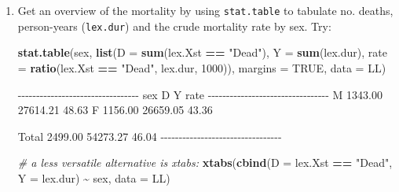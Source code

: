 \documentclass[
]{book}
\newenvironment{Shaded}{\begin{snugshade}}{\end{snugshade}}
\newcommand{\AttributeTok}[1]{\textcolor[rgb]{0.13,0.29,0.53}{#1}}
\newcommand{\CommentTok}[1]{\textcolor[rgb]{0.56,0.35,0.01}{\textit{#1}}}
\newcommand{\ConstantTok}[1]{\textcolor[rgb]{0.56,0.35,0.01}{#1}}
\newcommand{\DecValTok}[1]{\textcolor[rgb]{0.00,0.00,0.81}{#1}}
\newcommand{\FunctionTok}[1]{\textcolor[rgb]{0.13,0.29,0.53}{\textbf{#1}}}
\newcommand{\NormalTok}[1]{#1}
\newcommand{\SpecialCharTok}[1]{\textcolor[rgb]{0.81,0.36,0.00}{\textbf{#1}}}
\newcommand{\StringTok}[1]{\textcolor[rgb]{0.31,0.60,0.02}{#1}}
\begin{document}
\begin{enumerate}
  Take a look at the first few lines of the resulting dataset, for
  example using \texttt{head()}.
\item
  Get an overview of the mortality by using \texttt{stat.table}
  to tabulate no. deaths, person-years (\texttt{lex.dur}) and the
  crude mortality rate by sex. Try:

\begin{Shaded}
\begin{Highlighting}[]
\FunctionTok{stat.table}\NormalTok{(sex,}
           \FunctionTok{list}\NormalTok{(}\AttributeTok{D =} \FunctionTok{sum}\NormalTok{(lex.Xst }\SpecialCharTok{==} \StringTok{"Dead"}\NormalTok{),}
                \AttributeTok{Y =} \FunctionTok{sum}\NormalTok{(lex.dur),}
             \AttributeTok{rate =} \FunctionTok{ratio}\NormalTok{(lex.Xst }\SpecialCharTok{==} \StringTok{"Dead"}\NormalTok{,}
\NormalTok{                          lex.dur,}
                          \DecValTok{1000}\NormalTok{)),}
          \AttributeTok{margins =} \ConstantTok{TRUE}\NormalTok{,}
             \AttributeTok{data =}\NormalTok{ LL)}
\end{Highlighting}
\end{Shaded}

\begin{Shaded}
\begin{Highlighting}[]
\NormalTok{ {-}{-}{-}{-}{-}{-}{-}{-}{-}{-}{-}{-}{-}{-}{-}{-}{-}{-}{-}{-}{-}{-}{-}{-}{-}{-}{-}{-}{-}{-}{-}{-}{-} }
\NormalTok{ sex           D        Y    rate  }
\NormalTok{ {-}{-}{-}{-}{-}{-}{-}{-}{-}{-}{-}{-}{-}{-}{-}{-}{-}{-}{-}{-}{-}{-}{-}{-}{-}{-}{-}{-}{-}{-}{-}{-}{-} }
\NormalTok{ M       1343.00 27614.21   48.63  }
\NormalTok{ F       1156.00 26659.05   43.36  }

\NormalTok{ Total   2499.00 54273.27   46.04  }
\NormalTok{ {-}{-}{-}{-}{-}{-}{-}{-}{-}{-}{-}{-}{-}{-}{-}{-}{-}{-}{-}{-}{-}{-}{-}{-}{-}{-}{-}{-}{-}{-}{-}{-}{-} }
\end{Highlighting}
\end{Shaded}

\begin{Shaded}
\begin{Highlighting}[]
\CommentTok{\# a less versatile alternative is xtabs:}
\FunctionTok{xtabs}\NormalTok{(}\FunctionTok{cbind}\NormalTok{(}\AttributeTok{D =}\NormalTok{ lex.Xst }\SpecialCharTok{==} \StringTok{"Dead"}\NormalTok{,}
            \AttributeTok{Y =}\NormalTok{ lex.dur)}
      \SpecialCharTok{\textasciitilde{}}\NormalTok{ sex,}
      \AttributeTok{data =}\NormalTok{ LL)}
\end{Highlighting}
\end{Shaded}


\end{enumerate}
\end{document}
